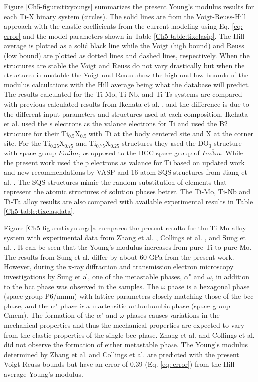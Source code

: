 Figure \ref{Ch5-figure:tixyoungs} summarizes the present Young's modulus results for each Ti-X binary system (circles). The solid lines are from the Voigt-Reuss-Hill approach with the elastic coefficients from the current modeling using Eq. \ref{eq: error} and the model parameters shown in Table \ref{Ch5-table:tixelasip}. The Hill average is plotted as a solid black line while the Voigt (high bound) and Reuss (low bound) are plotted as dotted lines and dashed lines, respectively. When the structures are stable the Voigt and Reuss do not vary drastically but when the structures is unstable the Voigt and Reuss show the high and low bounds of the modulus calculations with the Hill average being what the database will predict. The results calculated for the Ti-Mo, Ti-Nb, and Ti-Ta systems are compared with previous calculated results from Ikehata et al. \cite{Ikehata2004}, and the difference is due to the different input parameters and structures used at each composition. Ikehata et al. used the s electrons as the valance electrons for Ti and used the B2 structure for their Ti$_{0.5}$X$_{0.5}$ with Ti at the body centered site and X at the corner site. For the Ti$_{0.25}$X$_{0.75}$ and Ti$_{0.75}$X$_{0.25}$ structures they used the DO$_3$ structure with space group $Fm\overline{3}m$, as opposed to the BCC space group of $Im\overline{3}m$. While the present work used the p electrons as valance for Ti based on updated work and new recommendations by VASP and 16-atom SQS structures from Jiang et al. \cite{Jiang2004}. The SQS structures mimic the random substitution of elements that represent the atomic structures of solution phases better. The Ti-Mo, Ti-Nb and Ti-Ta alloy results are also compared with available experimental results \cite{Zhang2015,Boyer1994,Sung2015,Ozaki2004,Fedotov1985,Zhou2009a,Zhou2004a} in Table \ref{Ch5-table:tixelasdata}. 

Figure \ref{Ch5-figure:tixyoungs}a compares the present results for the Ti-Mo alloy system with experimental data from Zhang et al. \cite{Zhang2015}, Collings et al. \cite{Boyer1994}, and Sung et al. \cite{Sung2015}. It can be seen that the Young's modulus increases from pure Ti to pure Mo. The results from Sung et al. \cite{Sung2015} differ by about 60 GPa from the present work. However, during the x-ray diffraction and transmission electron microscopy investigations by Sung et al, one of the metastable phases, $\alpha$" and $\omega$, in addition to the bcc phase was observed in the samples. The $\omega$ phase is a hexagonal phase (space group P6/mmm) with lattice parameters closely matching those of the bcc phase, and the $\alpha$" phase is a martensitic orthorhombic phase (space group Cmcm). The formation of the $\alpha$" and $\omega$ phases causes variations in the mechanical properties and thus the mechanical properties are expected to vary from the elastic properties of the single bcc phase. Zhang et al. \cite{Zhang2015} and Collings et al. \cite{Boyer1994} did not observe the formation of either metastable phase. The Young's modulus determined by Zhang et al. and Collings et al. are predicted with the present Voigt-Reuss bounds but have an error of 0.39 (Eq. \ref{eq: error}) from the Hill average Young's modulus. 

